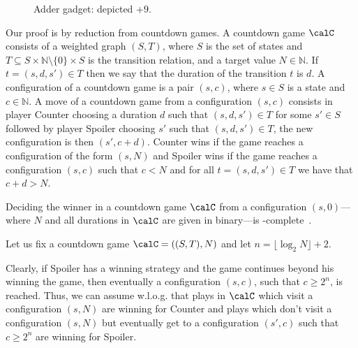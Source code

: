 \documentclass[a4paper]{article}
\begin{document}
\begin{figure}
\begin{center}
\caption{Adder gadget: depicted +$9$.}
\label{fig:adder-gadget}
\end{center}
\end{figure}

Our proof is by reduction from countdown games.  A countdown game $\calC$
consists of a weighted graph $(S,T)$, where $S$ is the set of states and $T
\subseteq S \times \mathbb{N} \setminus \{0\} \times S$ is the transition
relation, and a target value $N \in \mathbb{N}$. If $t = (s,d,s') \in T$ then we
say that the duration of the transition $t$ is $d$. A configuration of a
countdown game is a pair $(s,c)$, where $s \in S$ is a state and $c \in
\mathbb{N}$. A move of a countdown game from a configuration $(s,c)$ consists in
player Counter choosing a duration $d$ such that $(s,d,s') \in T$ for some $s'
\in S$ followed by player Spoiler choosing $s'$ such that $(s,d,s') \in T$, the
new configuration is then $(s', c + d)$. Counter wins if the game reaches a
configuration of the form $(s, N)$ and Spoiler wins if the game reaches a
configuration $(s,c)$ such that $c < N$ and for all $t = (s,d,s') \in T$ we have
that $c + d > N$.

Deciding the winner in a countdown game $\calC$ from a configuration
$(s,0)$---where $N$ and all durations in $\calC$ are given in binary---is
\EXP-complete~\cite{jsl08}.


Let us fix a countdown game $\calC = ((S,T),N)$ and let
$n = \lfloor \log_2 N \rfloor + 2$.

Clearly, if Spoiler has a winning strategy and the game continues beyond
his winning the game, then eventually a configuration $(s,c)$, such that
$c \ge 2^n$, is reached. Thus, we can assume w.l.o.g.  that plays in
$\calC$ which visit a configuration $(s,N)$ are winning for Counter and
plays which don't visit a configuration $(s,N)$ but eventually get to a
configuration $(s',c)$ such that $c \ge 2^n$ are winning for Spoiler.
\end{document}
